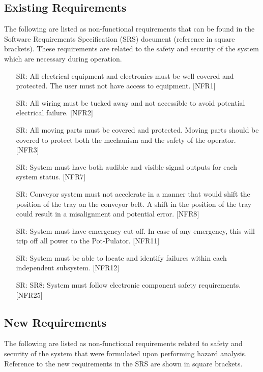 \documentclass{article}
\newcounter{srreqnum} %
\begin{document}
\subsection{Existing Requirements}
The following are listed as non-functional requirements that can be found in 
the Software Requirements Specification (SRS) document (reference in square brackets).
These requirements are related to the safety and security of the system which are necessary during operation.
\\
\begin{itemize}
    \item[SR\refstepcounter{srreqnum}\thesrreqnum \label{SR1}:]
    All electrical equipment and electronics must be well covered and protected. The user must not have access to equipment. [NFR1]
    \item[SR\refstepcounter{srreqnum}\thesrreqnum \label{SR2}:]
    All wiring must be tucked away and not accessible to avoid potential electrical failure. [NFR2]
    \item[SR\refstepcounter{srreqnum}\thesrreqnum \label{SR3}:]
    All moving parts must be covered and protected. Moving parts should be covered to protect both the mechanism and the safety of the operator. [NFR3]
    \item[SR\refstepcounter{srreqnum}\thesrreqnum \label{SR4}:]
    System must have both audible and visible signal outputs for each system status. [NFR7]
    \item[SR\refstepcounter{srreqnum}\thesrreqnum \label{SR5}:]
    Conveyor system must not accelerate in a manner that would shift the position of 
    the tray on the conveyor belt. A shift in the position of the tray could result in a misalignment and potential error. [NFR8]
    \item[SR\refstepcounter{srreqnum}\thesrreqnum \label{SR6}:]
    System must have emergency cut off. In case of any emergency, this will trip off all power to the Pot-Pulator. [NFR11]
    \item[SR\refstepcounter{srreqnum}\thesrreqnum \label{SR7}:]
    System must be able to locate and identify failures within each independent subsystem. [NFR12]
    \item[SR\refstepcounter{srreqnum}\thesrreqnum \label{SR8}:]
    SR8: System must follow electronic component safety requirements. [NFR25]
    
  \end{itemize}

\subsection{New Requirements}
The following are listed as non-functional requirements related to 
safety and security of the system that were formulated upon performing 
hazard analysis. Reference to the new requirements in the SRS are shown in square brackets.\\
\end{document}

